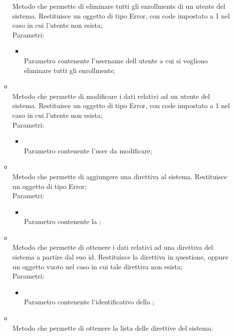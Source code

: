 \begin{itemize}
\begin{itemize}
		Metodo che permette di eliminare tutti gli enrollments di un utente del sistema. Restituisce un oggetto di tipo Error, con code impostato a 1 nel caso in cui l'utente non esista;\\
		Parametri:
		\begin{itemize}
			\item {} \\
			Parametro contenente l'username dell utente a cui si vogliono eliminare tutti gli enrollments;
		\end{itemize}
		\item[]  \\
		Metodo che permette di modificare i dati relativi ad un utente del sistema. Restituisce un oggetto di tipo Error, con code impostato a 1 nel caso in cui l'utente non esista;\\
		Parametri:
		\begin{itemize}
			\item {} \\
			Parametro contenente l'user da modificare;
		\end{itemize}
		\item[]  \\
		Metodo che permette di aggiungere una direttiva al sistema. Restituisce un oggetto di tipo Error;\\
		Parametri:
		\begin{itemize}
			\item {} \\
			Parametro contenente la ;
		\end{itemize}
		\item[]  \\
		Metodo che permette di ottenere i dati relativi ad una direttiva del sistema a partire dal suo id. Restituisce la direttiva in questione, oppure un oggetto vuoto nel caso in cui tale direttiva non esista;\\
		Parametri:
		\begin{itemize}
			\item {} \\
			Parametro contenente l'identificativo della ;
		\end{itemize}
		\item[]  \\
		Metodo che permette di ottenere la lista delle direttive del sistema.

\end{itemize}
\end{itemize}
